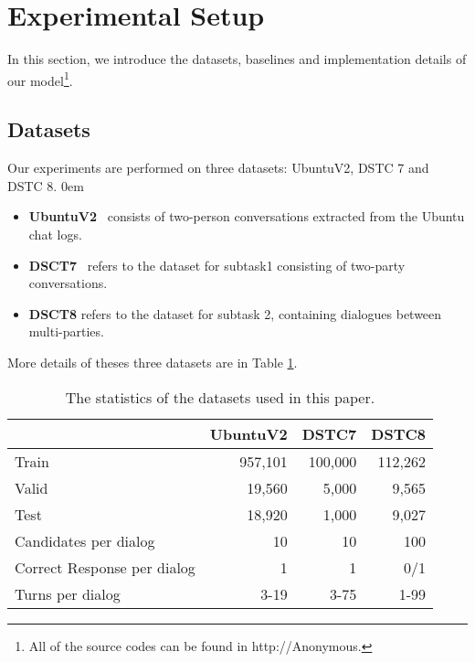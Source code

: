 \section{Experimental Setup}
\label{sec:eval}
In this section, we introduce the datasets, baselines and implementation details of our model\footnote{All of the source codes
can be found in http://Anonymous.}.

\subsection{Datasets}
Our experiments are performed on three datasets:
UbuntuV2, DSTC 7 and DSTC 8. %
\itemsep0em
\begin{itemize}

\item \textbf{UbuntuV2}~\cite{LowePSCLP17} consists of two-person conversations extracted from the Ubuntu chat logs.

\item \textbf{DSCT7}~\cite{gunasekara2019dstc7} refers to the dataset for subtask1 consisting of two-party conversations.


\item \textbf{DSCT8} refers to the dataset for subtask 2, containing dialogues between multi-parties.
\end{itemize}
More details of theses three datasets are in Table \ref{tab:dataset}.

\begin{table}[th]
	\centering
	\scriptsize
	\begin{tabular}{lrrr}
		\toprule[1pt]
		\textbf{} & {UbuntuV2}& {DSTC7}& {DSTC8} \\ 
    	\midrule[1pt]
		{Train} & 957,101 &100,000&112,262\\
		{Valid} & 19,560 & 5,000&9,565\\
		{Test} &18,920 &1,000&9,027\\
		{Candidates per dialog} &10& 10&100\\
		{Correct Response per dialog}&1&1&0/1 \\
		{Turns per dialog} & 3-19&3-75& 1-99\\
		\bottomrule[1pt]
	\end{tabular}
	\caption{The statistics of the datasets used in this paper.}
	\label{tab:dataset}
\end{table}




